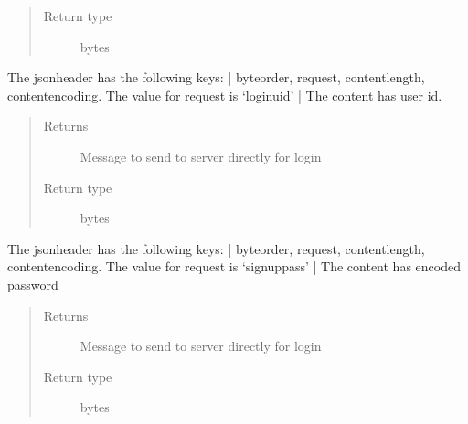 \documentclass[letterpaper,10pt,english]{sphinxmanual}
\begin{document}
\begin{fulllineitems}
\begin{fulllineitems}
\begin{quote}
\begin{description}
\item[{Return type}] \leavevmode
bytes

\end{description}\end{quote}

\end{fulllineitems}


\begin{fulllineitems}
\label{\detokenize{Message:Message.Message._create_loginuid_request}}
The jsonheader has the following keys: |
byteorder, request, content\sphinxhyphen{}length, content\sphinxhyphen{}encoding. The value for request is ‘loginuid’ |
The content has user id.
\begin{quote}\begin{description}
\item[{Returns}] \leavevmode
Message to send to server directly for login

\item[{Return type}] \leavevmode
bytes

\end{description}\end{quote}

\end{fulllineitems}


\begin{fulllineitems}
\label{\detokenize{Message:Message.Message._create_signuppass_request}}
The jsonheader has the following keys: |
byteorder, request, content\sphinxhyphen{}length, content\sphinxhyphen{}encoding. The value for request is ‘signuppass’ |
The content has encoded password
\begin{quote}\begin{description}
\item[{Returns}] \leavevmode
Message to send to server directly for login

\item[{Return type}] \leavevmode
bytes


\end{description}
\end{quote}
\end{fulllineitems}
\end{fulllineitems}
\end{document}
